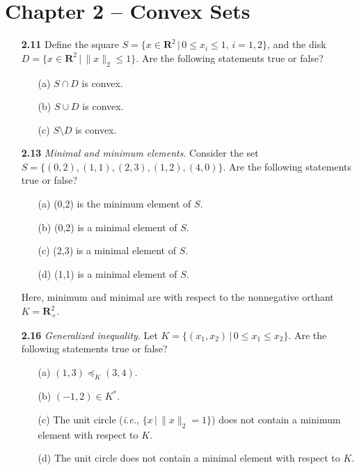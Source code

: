 \documentclass[11pt,a4paper]{article}
\begin{document}
\section*{Chapter 2 -- Convex Sets}

\begin{itemize}
    \item[\textbf{2.11}] Define the square $S = \{x \in \mathbf{R}^2 \,\vert\, 0 \leq x_i \leq 1, \, i = 1, 2\}$, and the disk $D = \{x \in \mathbf{R}^2 \, \vert \, \|x\|_2 \leq 1\}$. Are the following statements true or false?
    \item[] \begin{itemize}
        \item[(a)] $S \cap D$ is convex.
        \item[(b)] $S \cup D$ is convex.
        \item[(c)] $S \setminus D$ is convex.
    \end{itemize}
    \item[\textbf{2.13}] \textit{Minimal and minimum elements}. Consider the set $S = \{(0,2), (1,1), (2,3), (1,2), (4,0)\}$. Are the following statements true or false?
    \item[] \begin{itemize}
        \item[(a)] (0,2) is the minimum element of $S$.
        \item[(b)] (0,2) is a minimal element of $S$.
        \item[(c)] (2,3) is a minimal element of $S$.
        \item[(d)] (1,1) is a minimal element of $S$.
    \end{itemize}
        Here, minimum and minimal are with respect to the nonnegative orthant $K = \mathbf{R}_+^2$.
    \item[\textbf{2.16}] \textit{Generalized inequality}. Let $K = \{(x_1,x_2) \, \vert \, 0 \leq x_1 \leq x_2\}$. Are the following statements true or false?
    \item[] \begin{itemize}
        \item[(a)] $(1,3) \preceq_K (3,4)$.
        \item[(b)] $(-1,2) \in K^*$.
        \item[(c)] The unit circle (\textit{i.e.}, $\{x \, \vert \, \|x\|_2 = 1\}$) does not contain a minimum element with respect to $K$.
        \item[(d)] The unit circle does not contain a minimal element with respect to $K$.
    \end{itemize}
\end{itemize}
\end{document}
